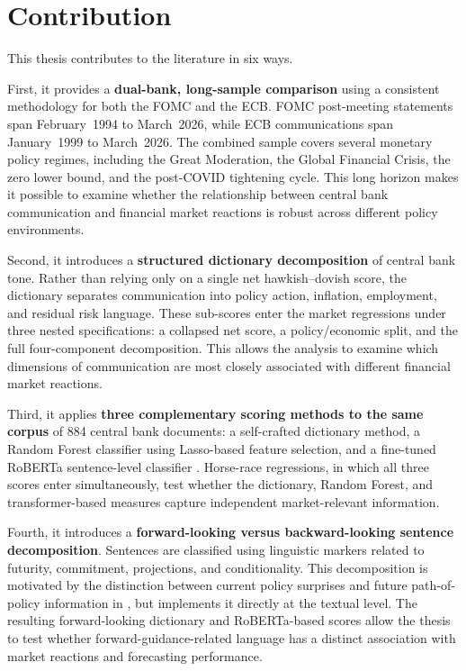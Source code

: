 \section{Contribution}
\label{sec:intro_contribution}

This thesis contributes to the literature in six ways.

First, it provides a \textbf{dual-bank, long-sample comparison} using a
consistent methodology for both the FOMC and the ECB. FOMC
post-meeting statements span February~1994 to March~2026, while ECB
communications span January~1999 to March~2026. The combined sample
covers several monetary policy regimes, including the Great Moderation,
the Global Financial Crisis, the zero lower bound, and the post-COVID
tightening cycle. This long horizon makes it possible to examine whether
the relationship between central bank communication and financial market
reactions is robust across different policy environments.

Second, it introduces a \textbf{structured dictionary decomposition} of
central bank tone. Rather than relying only on a single net
hawkish--dovish score, the dictionary separates communication into
policy action, inflation, employment, and residual risk language. These
sub-scores enter the market regressions under three nested
specifications: a collapsed net score, a policy/economic split, and the
full four-component decomposition. This allows the analysis to examine
which dimensions of communication are most closely associated with
different financial market reactions.

Third, it applies \textbf{three complementary scoring methods to the
same corpus} of 884 central bank documents: a self-crafted dictionary
method, a Random Forest classifier using Lasso-based feature selection,
and a fine-tuned RoBERTa sentence-level classifier \citep{shah2023}.
Horse-race regressions, in which all three scores enter simultaneously,
test whether the dictionary, Random Forest, and transformer-based
measures capture independent market-relevant information.

Fourth, it introduces a \textbf{forward-looking versus backward-looking
sentence decomposition}. Sentences are classified using linguistic
markers related to futurity, commitment, projections, and
conditionality. This decomposition is motivated by the distinction
between current policy surprises and future path-of-policy information
in \citet{gurkaynak2005}, but implements it directly at the textual
level. The resulting forward-looking dictionary and RoBERTa-based scores
allow the thesis to test whether forward-guidance-related language has a
distinct association with market reactions and forecasting performance.

